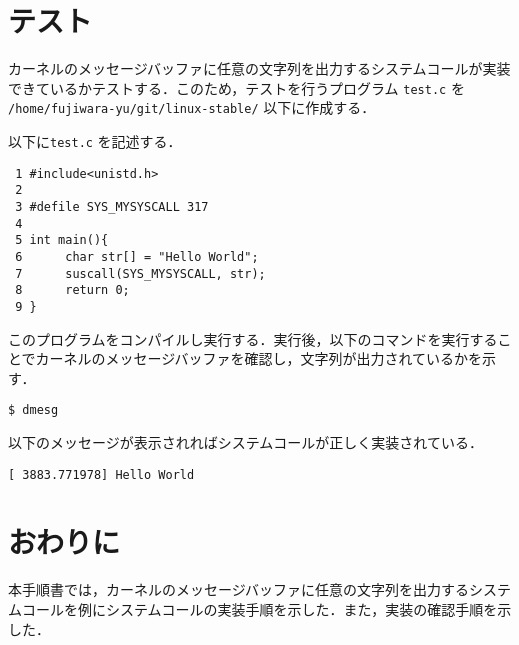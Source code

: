 \documentclass[12pt]{jsarticle}
\begin{document}
\section{テスト}\label{sec:test}

カーネルのメッセージバッファに任意の文字列を出力するシステムコールが実装できているかテストする．このため，テストを行うプログラム \verb|test.c| を \verb|/home/fujiwara-yu/git/linux-stable/| 以下に作成する．

以下に\verb|test.c| を記述する．
\begin{verbatim}
 1 #include<unistd.h>
 2
 3 #defile SYS_MYSYSCALL 317
 4
 5 int main(){
 6      char str[] = "Hello World";
 7      suscall(SYS_MYSYSCALL, str);
 8      return 0;
 9 }
\end{verbatim}
このプログラムをコンパイルし実行する．実行後，以下のコマンドを実行することでカーネルのメッセージバッファを確認し，文字列が出力されているかを示す．
\begin{verbatim}
$ dmesg
\end{verbatim}
以下のメッセージが表示されればシステムコールが正しく実装されている．
\begin{verbatim}
[ 3883.771978] Hello World
\end{verbatim}

\section{おわりに}\label{sec:conclusion}
本手順書では，カーネルのメッセージバッファに任意の文字列を出力するシステムコールを例にシステムコールの実装手順を示した．また，実装の確認手順を示した．
\end{document}
